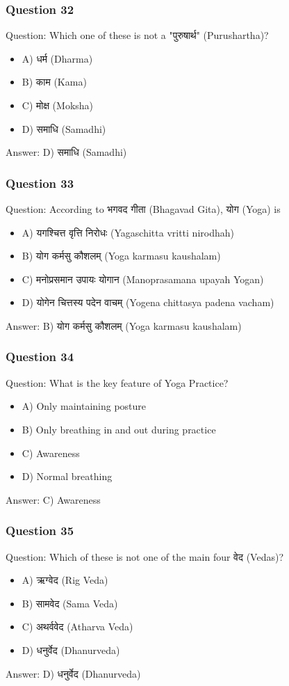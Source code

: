 \begin{frame}[fragile]\frametitle{Question 32}
Question: Which one of these is not a "पुरुषार्थ" (Purushartha)?
\begin{itemize}
\item A) धर्म (Dharma)
\item B) काम (Kama)
\item C) मोक्ष (Moksha)
\item D) समाधि (Samadhi)
\end{itemize}
Answer: D) समाधि (Samadhi)
\end{frame}

\begin{frame}[fragile]\frametitle{Question 33}
Question: According to भगवद गीता (Bhagavad Gita), योग (Yoga) is
\begin{itemize}
\item A) यगश्चित्त वृत्ति निरोधः (Yagaschitta vritti nirodhah)
\item B) योग कर्मसु कौशलम् (Yoga karmasu kaushalam)
\item C) मनोप्रसमान उपायः योगान (Manoprasamana upayah Yogan)
\item D) योगेन चित्तस्य पदेन वाचम् (Yogena chittasya padena vacham)
\end{itemize}
Answer: B) योग कर्मसु कौशलम् (Yoga karmasu kaushalam)
\end{frame}

\begin{frame}[fragile]\frametitle{Question 34}
Question: What is the key feature of Yoga Practice?
\begin{itemize}
\item A) Only maintaining posture
\item B) Only breathing in and out during practice
\item C) Awareness
\item D) Normal breathing
\end{itemize}
Answer: C) Awareness
\end{frame}

\begin{frame}[fragile]\frametitle{Question 35}
Question: Which of these is not one of the main four वेद (Vedas)?
\begin{itemize}
\item A) ऋग्वेद (Rig Veda)
\item B) सामवेद (Sama Veda)
\item C) अथर्ववेद (Atharva Veda)
\item D) धनुर्वेद (Dhanurveda)
\end{itemize}
Answer: D) धनुर्वेद (Dhanurveda)
\end{frame}

